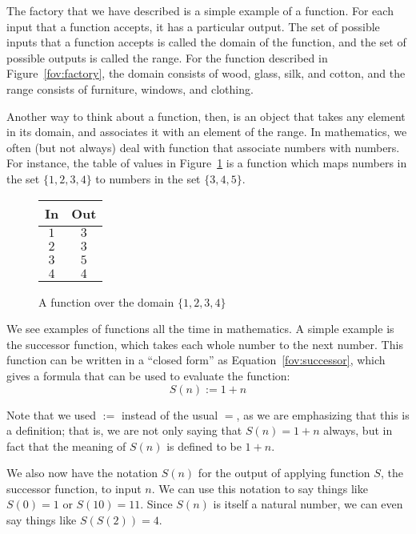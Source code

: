 \documentclass[a4paper,10pt]{report}
\begin{document}
The factory that we have described is a simple example of a \gls{function}. For each input
that a function accepts, it has a particular output. The set of possible inputs that a
function accepts is called the \gls{domain} of the function, and the set of possible outputs
is called the \gls{range}. For the function described in Figure~\ref{fov:factory}, the
domain consists of wood, glass, silk, and cotton, and the range consists of furniture,
windows, and clothing.

Another way to think about a function, then, is an object that takes any element in its
domain, and associates it with an element of the range. In mathematics, we often (but not
always) deal with function that associate numbers with numbers. For instance, the table of
values in Figure~\ref{fov:numberfunction} is a function which maps numbers in the set \(\{1,
2, 3, 4\}\) to numbers in the set \(\{3, 4, 5\}\).

\begin{figure}
  \renewcommand{\arraystretch}{1.2}
  \begin{tabular}{|c|c|}
    \hline
    \textbf{In} & \textbf{Out} \\
    \hline
    \(1\) & \(3\) \\
    \(2\) & \(3\) \\
    \(3\) & \(5\) \\
    \(4\) & \(4\) \\
    \hline
  \end{tabular}

  \caption{A function over the domain \(\{1, 2, 3, 4\}\)}
  \label{fov:numberfunction}
\end{figure}

We see examples of functions all the time in mathematics. A simple example is the successor
function, which takes each whole number to the next number. This function can be written in
a ``closed form'' as Equation~\ref{fov:successor}, which gives a formula that can be used to
evaluate the function:
\begin{equation}
  S(n) := 1+n
  \label{fov:successor}
\end{equation}

Note that we used \(:=\) instead of the usual \(=\), as we are emphasizing that this is a
definition; that is, we are not only saying that \(S(n) = 1+n\) always, but in fact that
the meaning of \(S(n)\) is defined to be \(1+n\).

We also now have the notation \(S(n)\) for the output of applying function \(S\), the
successor function, to input \(n\). We can use this notation to say things like \(S(0) = 1\)
or \(S(10) = 11\). Since \(S(n)\) is itself a natural number, we can even say things like
\(S(S(2)) = 4\).
\end{document}
